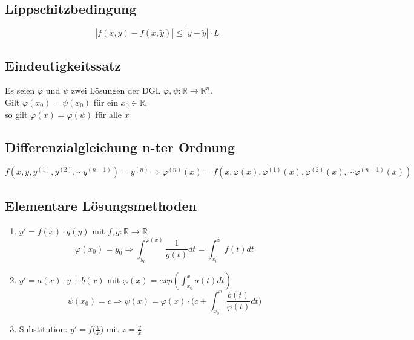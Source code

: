 \subsection{Lippschitzbedingung}
\begin{equation*}
    |f(x, y) - f(x, \tilde{y})| \leq |y - \tilde{y}| \cdot L
\end{equation*}

\subsection{Eindeutigkeitssatz}
Es seien $\varphi$ und $\psi$ zwei Lösungen der DGL $\varphi, \psi: \mathbb{R} \rightarrow \mathbb{R}^n$. \\
Gilt $\varphi(x_0) = \psi(x_0)$ für ein $x_0 \in \mathbb{R}$, \\
so gilt $\varphi(x) = \varphi(\psi)$ für alle $x$

\subsection{Differenzialgleichung n-ter Ordnung}
\begin{equation*}
    f(x, y, y^{(1)}, y^{(2)}, \cdots y^{(n-1)}) = y^{(n)}
    \Rightarrow
    \varphi^{(n)}(x) = f(x, \varphi(x), \varphi^{(1)}(x), \varphi^{(2)}(x), \cdots \varphi^{(n-1)}(x))
\end{equation*}

\subsection{Elementare Lösungsmethoden}
\begin{enumerate}
    \item $y' = f(x) \cdot g(y)$ mit $f,g: \mathbb{R} \rightarrow \mathbb{R}$
    \begin{equation*}
        \varphi(x_0) = y_0 \Rightarrow
        \int_{y_0}^{\varphi(x)} \frac{1}{g(t)} dt
        = \int_{x_0}^x f(t) dt
    \end{equation*}

    \item $y' = a(x) \cdot y + b(x)$ mit $\varphi(x) = exp(\int_{x_0}^x a(t) dt)$
    \begin{equation*}
        \psi(x_0) = c \Rightarrow
        \psi(x) = \varphi(x) \cdot \bigg(c + \int_{x_0}^x \frac{b(t)}{\varphi(t)} dt\bigg)
    \end{equation*}

    \item Substitution: $y' = f\big(\frac{y}{x}\big)$ mit $z = \frac{y}{x}$
\end{enumerate}
